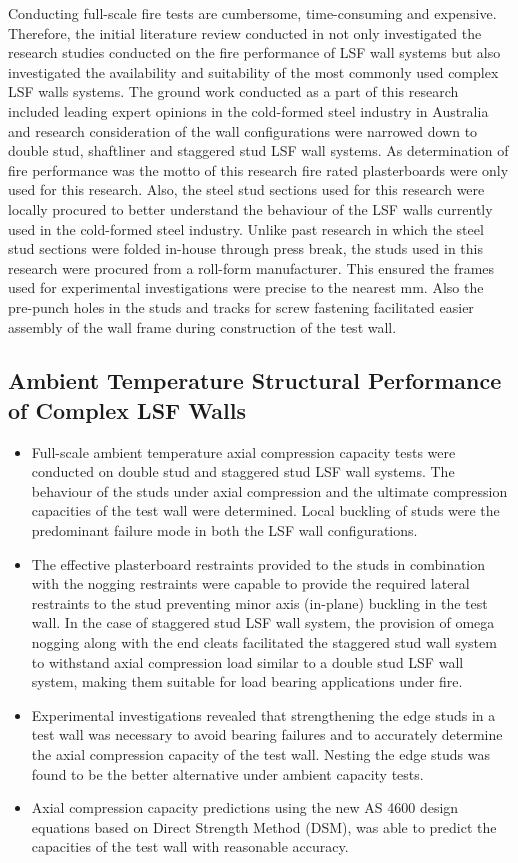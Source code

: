 Conducting full-scale fire tests are cumbersome, time-consuming and expensive. Therefore, the initial literature review conducted in  not only investigated the research studies conducted on the fire performance of LSF wall systems but also investigated the availability and suitability of the most commonly used complex LSF walls systems. The ground work conducted as a part of this research included leading expert opinions in the cold-formed steel industry in Australia and research consideration of the wall configurations were narrowed down to double stud, shaftliner and staggered stud LSF wall systems. As determination of fire performance was the motto of this research fire rated plasterboards were only used for this research. Also, the steel stud sections used for this research were locally procured to better understand the behaviour of the LSF walls currently used in the cold-formed steel industry. Unlike past research in which the steel stud sections were folded in-house through press break, the studs used in this research were procured from a roll-form manufacturer. This ensured the frames used for experimental investigations were precise to the nearest mm. Also the pre-punch holes in the studs and tracks for screw fastening facilitated easier assembly of the wall frame during construction of the test wall.  

\subsection{Ambient Temperature Structural Performance of Complex LSF Walls}
\begin{itemize}
	\item Full-scale ambient temperature axial compression capacity tests were conducted on double stud and staggered stud LSF wall systems. The behaviour of the studs under axial compression and the ultimate compression capacities of the test wall were determined. Local buckling of studs were the predominant failure mode in both the LSF wall configurations.
	\item The effective plasterboard restraints provided to the studs in combination with the nogging restraints were capable to provide the required lateral restraints to the stud preventing minor axis (in-plane) buckling in the test wall. In the case of staggered stud LSF wall system, the provision of omega nogging along with the end cleats facilitated the staggered stud wall system to withstand axial compression load similar to a double stud LSF wall system, making them suitable for load bearing applications under fire.
	\item Experimental investigations revealed that strengthening the edge studs in a test wall was necessary to avoid bearing failures and to accurately determine the axial compression capacity of the test wall. Nesting the edge studs was found to be the better alternative under ambient capacity tests.  
	\item Axial compression capacity predictions using the new AS 4600 design equations based on Direct Strength Method (DSM), was able to predict the capacities of the test wall with reasonable accuracy.  
\end{itemize}


